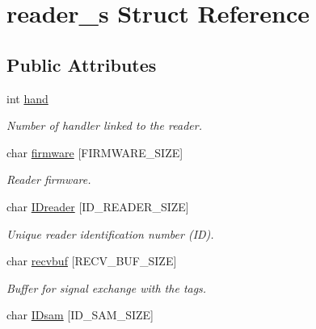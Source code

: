 \hypertarget{structreader__s}{
\section{reader\_\-s Struct Reference}
\label{structreader__s}
}
\subsection*{Public Attributes}
\begin{DoxyCompactItemize}
\item 
\hypertarget{structreader__s_a72ac2207a2af27df10b82b7861d35025}{
int \hyperlink{structreader__s_a72ac2207a2af27df10b82b7861d35025}{hand}}
\label{structreader__s_a72ac2207a2af27df10b82b7861d35025}

\begin{DoxyCompactList}\small\item\em Number of handler linked to the reader. \item\end{DoxyCompactList}\item 
\hypertarget{structreader__s_abbe696e34944b85a5ab6b4c199a2b56e}{
char \hyperlink{structreader__s_abbe696e34944b85a5ab6b4c199a2b56e}{firmware} \mbox{[}FIRMWARE\_\-SIZE\mbox{]}}
\label{structreader__s_abbe696e34944b85a5ab6b4c199a2b56e}

\begin{DoxyCompactList}\small\item\em Reader firmware. \item\end{DoxyCompactList}\item 
\hypertarget{structreader__s_a8a1c273a343b3753fbbbae15fde57255}{
char \hyperlink{structreader__s_a8a1c273a343b3753fbbbae15fde57255}{IDreader} \mbox{[}ID\_\-READER\_\-SIZE\mbox{]}}
\label{structreader__s_a8a1c273a343b3753fbbbae15fde57255}

\begin{DoxyCompactList}\small\item\em Unique reader identification number (ID). \item\end{DoxyCompactList}\item 
\hypertarget{structreader__s_a5fa6925cbe0bcf046eacc2795a308d23}{
char \hyperlink{structreader__s_a5fa6925cbe0bcf046eacc2795a308d23}{recvbuf} \mbox{[}RECV\_\-BUF\_\-SIZE\mbox{]}}
\label{structreader__s_a5fa6925cbe0bcf046eacc2795a308d23}

\begin{DoxyCompactList}\small\item\em Buffer for signal exchange with the tags. \item\end{DoxyCompactList}\item 
\hypertarget{structreader__s_a8ea90506a9ed390e95f406a683713fae}{
char \hyperlink{structreader__s_a8ea90506a9ed390e95f406a683713fae}{IDsam} \mbox{[}ID\_\-SAM\_\-SIZE\mbox{]}}
\label{structreader__s_a8ea90506a9ed390e95f406a683713fae}


\end{DoxyCompactItemize}
